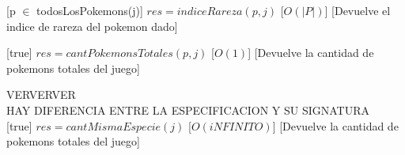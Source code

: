 \begin{Interfaz}
%
[p $\in$ todosLosPokemons(j)] 
{$res = indiceRareza(p, j)$}  %
[$O(|P|)$] %
[Devuelve el indice de rareza del pokemon dado]


%
[true] 
{$res = cantPokemonsTotales(p, j)$}  %
[$O(1)$] %
[Devuelve la cantidad de pokemons totales del juego]


VERVERVER \\
HAY DIFERENCIA ENTRE LA ESPECIFICACION Y SU SIGNATURA \\
%
[true] 
{$res = cantMismaEspecie(j)$}  %
[$O(iNFINITO)$] %
[Devuelve la cantidad de pokemons totales del juego]


\end{Interfaz}

~ 


